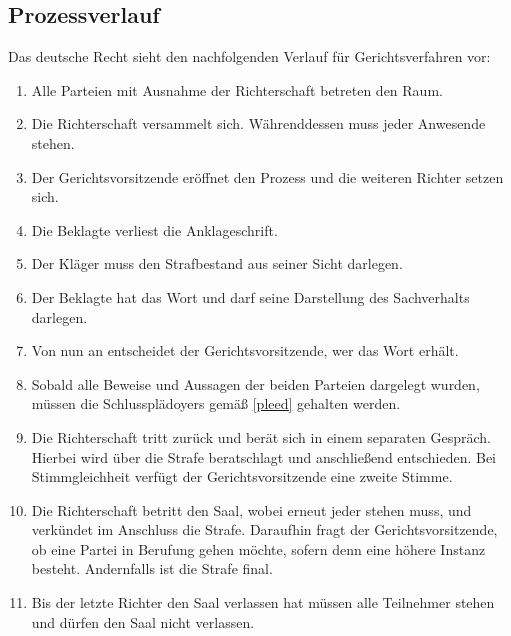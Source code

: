 \documentclass{article}
\begin{document}
\subsection{Prozessverlauf}\label{verlauf}
Das deutsche Recht sieht den nachfolgenden Verlauf für Gerichtsverfahren vor:
\begin{enumerate}[1.]
    \item Alle Parteien mit Ausnahme der Richterschaft betreten den Raum.
    \item Die Richterschaft versammelt sich. Währenddessen muss jeder Anwesende stehen.
    \item Der Gerichtsvorsitzende eröffnet den Prozess und die weiteren Richter setzen sich.
    \item Die Beklagte verliest die Anklageschrift.
    \item Der Kläger muss den Strafbestand aus seiner Sicht darlegen.
    \item Der Beklagte hat das Wort und darf seine Darstellung des Sachverhalts darlegen.
    \item Von nun an entscheidet der Gerichtsvorsitzende, wer das Wort erhält.
    \item Sobald alle Beweise und Aussagen der beiden Parteien dargelegt wurden, müssen die Schlussplädoyers gemäß \ref{pleed} gehalten werden.
    \item Die Richterschaft tritt zurück und berät sich in einem separaten Gespräch. Hierbei wird über die Strafe beratschlagt und anschließend entschieden. Bei Stimmgleichheit verfügt der Gerichtsvorsitzende eine zweite Stimme.
    \item Die Richterschaft betritt den Saal, wobei erneut jeder stehen muss, und verkündet im Anschluss die Strafe. Daraufhin fragt der Gerichtsvorsitzende, ob eine Partei in Berufung gehen möchte, sofern denn eine höhere Instanz besteht. Andernfalls ist die Strafe final.
    \item Bis der letzte Richter den Saal verlassen hat müssen alle Teilnehmer stehen und dürfen den Saal nicht verlassen.    
\end{enumerate}
\end{document}
